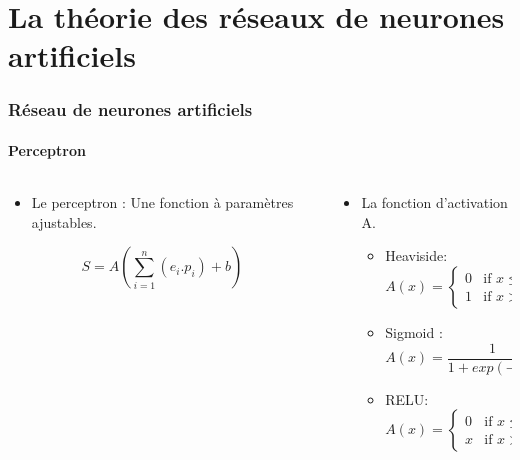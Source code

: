 \section{La théorie des réseaux de neurones artificiels}


\begin{frame}
\frametitle{Réseau de neurones artificiels}
\framesubtitle{Perceptron}
\begin{columns}
    \begin{column}{6cm}
        \begin{itemize}
            \item<1->   Le perceptron : Une fonction à paramètres ajustables.
        \end{itemize}
        \centering
        \begin{figure}
        
        \end{figure}
        $$S=A(\sum_{i=1}^{n} (e_i . p_i) + b)$$
    \end{column}
\begin{column}{6cm}
    \begin{itemize}
    \item<2->La fonction d'activation A.
    \begin{itemize}
    \item<2->Heaviside:
    \[A(x) =\begin{cases}
                                   0 & \text{if $x\leqslant0$} \\
                                   1 & \text{if $x>0$}
            \end{cases}\]
    \item<2->Sigmoid : 
    $$ A(x) = \frac{1}{1+exp(-x)}$$
    \item<2->RELU:
    \[A(x) =\begin{cases}
                                   0 & \text{if $x\leqslant0$} \\
                                   x & \text{if $x>0$}
            \end{cases}\]
    \end{itemize}
    \end{itemize}
\end{column}
\end{columns}
\end{frame}


